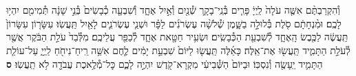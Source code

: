 \documentclass[twoside, openany, parskip=half, 11pt]{book}
\begin{document}
\begin{footnotesize}
\begin{multicols}{2}
\\
\\
וְ֯הִקְרַבְתֶּ֨ם אִשֶּׁ֤ה עֹלָה֙ לַֽיְיָ֔ פָּרִ֧ים בְּ֯נֵֽי־בָקָ֛ר שְׁ֯נַ֖יִם וְ֯אַ֣יִל אֶחָ֑ד וְ֯שִׁבְעָ֤ה כְ֯בָשִׂים֙ בְּ֯נֵ֣י שָׁנָ֔ה תְּ֯מִימִ֖ם יִהְי֥וּ לָכֶֽם׃ וּמִ֨נְחָתָ֔ם סֹ֖לֶת בְּ֯לוּלָ֣ה בַשָּׁ֑מֶן שְׁ֯לֹשָׁ֨ה עֶשְׂרֹנִ֜ים לַפָּ֗ר וּשְׁנֵ֧י עֶשְׂרֹנִ֛ים לָאַ֖יִל תַּֽעֲשֽׂוּ׃ עִשָּׂר֤וֹן עִשָּׂרוֹן֙ תַּֽעֲשֶׂ֔ה לַכֶּ֖בֶשׂ הָֽאֶחָ֑ד לְ֯שִׁבְעַ֖ת הַכְּ֯בָשִֽׂים׃ וּשְׂעִ֥יר חַטָּ֖את אֶחָ֑ד לְ֯כַפֵּ֖ר עֲלֵיכֶֽם׃ מִלְּ֯בַד֙ עֹלַ֣ת הַבֹּ֔קֶר אֲשֶׁ֖ר לְ֯עֹלַ֣ת הַתָּמִ֑יד תַּֽעֲשׂ֖וּ אֶת־אֵֽלֶּה׃ כָּאֵ֜לֶּה תַּֽעֲשׂ֤וּ לַיּוֹם֙ שִׁבְעַ֣ת יָמִ֔ים לֶ֛חֶם אִשֵּׁ֥ה רֵֽיחַ־נִיחֹ֖חַ לַֽיְיָ֑ עַל־עוֹלַ֧ת הַתָּמִ֛יד יֵֽעָשֶׂ֖ה וְ֯נִסְכּֽוֹ׃ וּבַיּוֹם֙ הַשְּׁ֯בִיעִ֔י מִקְרָא־קֹ֖דֶשׁ יִהְיֶ֣ה לָכֶ֑ם כׇּל־מְ֯לֶ֥אכֶת עֲבֹדָ֖ה לֹ֥א תַֽעֲשֽׂוּ׃ \textbf{ס}


\end{multicols}
\end{footnotesize}
\end{document}
